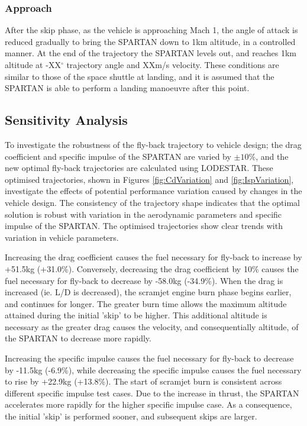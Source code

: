 \subsubsection{ Approach}
After the skip phase, as the vehicle is approaching Mach 1, the angle of attack is reduced gradually to bring the SPARTAN down to 1km altitude, in a controlled manner. 
At the end of the trajectory the SPARTAN levels out, and reaches 1km altitude at -XX$^\circ$ trajectory angle and XXm/s velocity. These conditions are similar to those of the space shuttle at landing\cite{Ryba2017}, and it is assumed that the SPARTAN is able to perform a landing manoeuvre after this point. 








\subsection{Sensitivity Analysis}
To investigate the robustness of the fly-back trajectory to vehicle design; the drag coefficient and specific impulse of the SPARTAN are varied by $\pm 10\%$, and the new optimal fly-back trajectories are calculated using LODESTAR. These optimised trajectories, shown in Figures \ref{fig:CdVariation} and \ref{fig:IspVariation}, investigate the effects of potential performance variation caused by changes in the vehicle design.
The consistency of the trajectory shape indicates that the optimal solution is robust with variation in the aerodynamic parameters and specific impulse of the SPARTAN. The optimised trajectories show clear trends with variation in vehicle parameters.

Increasing the drag coefficient causes the fuel necessary for fly-back to increase by +51.5kg (+31.0\%). Conversely, decreasing the drag coefficient by 10\% causes the fuel necessary for  fly-back to decrease by -58.0kg (-34.9\%). 
When the drag is increased (ie. L/D is decreased), the scramjet engine burn phase begins earlier, and continues for longer. 
The greater burn time allows the maximum altitude attained during the initial 'skip' to be higher. 
This additional altitude is necessary as the greater drag causes the velocity, and consequentially altitude, of the SPARTAN to decrease more rapidly.


Increasing the specific impulse causes the fuel necessary for fly-back to decrease by -11.5kg (-6.9\%), while decreasing the specific impulse causes the fuel necessary to rise by +22.9kg (+13.8\%). The start of scramjet burn is consistent across different specific impulse test cases. Due to the increase in thrust, the SPARTAN accelerates more rapidly for the higher specific impulse case. As a consequence, the initial 'skip' is performed sooner, and subsequent skips are larger. 

